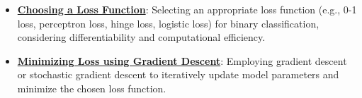\documentclass{article}%
\begin{document}
\begin{itemize}[leftmargin=*]
\item \href{https://purdue.brightspace.com/d2l/common/assets/pdfjs-d2l-dist/1.0.14-legacy/web/viewer.html?file=\%2Fcontent\%2Fenforced\%2F1095467-wl.202510.CS.24300.001\%2F05L2-ML Basics.pdf\%3Fou\%3D1095467\&lang=en-us\&container=d2l-fileviewer-rendered-pdf\&fullscreen=d2l-fileviewer-rendered-pdf-dialog\&height=667#page=25}{\textbf{Choosing a Loss Function}}: Selecting an appropriate loss function (e.g., 0{-}1 loss, perceptron loss, hinge loss, logistic loss) for binary classification, considering differentiability and computational efficiency.%
\item \href{https://purdue.brightspace.com/d2l/common/assets/pdfjs-d2l-dist/1.0.14-legacy/web/viewer.html?file=\%2Fcontent\%2Fenforced\%2F1095467-wl.202510.CS.24300.001\%2F05L2-ML Basics.pdf\%3Fou\%3D1095467\&lang=en-us\&container=d2l-fileviewer-rendered-pdf\&fullscreen=d2l-fileviewer-rendered-pdf-dialog\&height=667#page=28}{\textbf{Minimizing Loss using Gradient Descent}}: Employing gradient descent or stochastic gradient descent to iteratively update model parameters and minimize the chosen loss function.%
\end{itemize}

%
\end{document}
